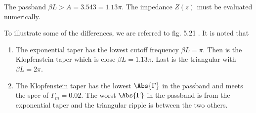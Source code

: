 {\begin{itemize}
The passband \( \beta L > A  = 3.543 = 1.13 \pi \).  The impedance \( Z(z) \) must be evaluated numerically.

\end{itemize}

To illustrate some of the differences, we are referred to fig. 5.21 \citep{pozar2009microwave}.  It is noted that

\begin{enumerate}
\item The exponential taper has the lowest cutoff frequency \( \beta L = \pi \).  Then is the Klopfenstein taper which is close \( \beta L = 1.13 \pi \).  Last is the triangular with \( \beta L = 2 \pi \).
\item The Klopfenstein taper has the lowest \( \Abs{\Gamma} \) in the passband and meets the spec of \( \Gamma_m = 0.02 \).  The worst \( \Abs{\Gamma} \) in the passband is from the exponential taper and the triangular ripple is between the two others.
\end{enumerate}
} %
